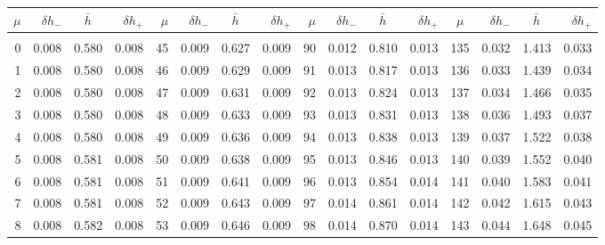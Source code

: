 \clearpage
\begin{table}[!h]\centering
\vspace{0.25cm}
\scriptsize{ \begin{tabular}{rrrr|rrrr|rrrr|crrr}
$\mu$ & $\delta h_-$  & $\bar{h}~~~~$ & $\delta h_+$ &
$\mu$ & $\delta h_-$  & $\bar{h}~~~~$ & $\delta h_+$ &
$\mu$ & $\delta h_-$  & $\bar{h}~~~~$ & $\delta h_+$ &
$\mu$ & $\delta h_-$  & $\bar{h}~~~~$ & $\delta h_+$ \\\hline
&&&&&&&&&&&&&&&\\[-1.75ex]
  0 & \tiny{  0.008} &   0.580 & \tiny{  0.008} &  45 & \tiny{  0.009} &   0.627 & \tiny{  0.009} &  90 & \tiny{  0.012} &   0.810 & \tiny{  0.013} & 135 & \tiny{  0.032} &   1.413 & \tiny{  0.033}\\
  1 & \tiny{  0.008} &   0.580 & \tiny{  0.008} &  46 & \tiny{  0.009} &   0.629 & \tiny{  0.009} &  91 & \tiny{  0.013} &   0.817 & \tiny{  0.013} & 136 & \tiny{  0.033} &   1.439 & \tiny{  0.034}\\
  2 & \tiny{  0.008} &   0.580 & \tiny{  0.008} &  47 & \tiny{  0.009} &   0.631 & \tiny{  0.009} &  92 & \tiny{  0.013} &   0.824 & \tiny{  0.013} & 137 & \tiny{  0.034} &   1.466 & \tiny{  0.035}\\
  3 & \tiny{  0.008} &   0.580 & \tiny{  0.008} &  48 & \tiny{  0.009} &   0.633 & \tiny{  0.009} &  93 & \tiny{  0.013} &   0.831 & \tiny{  0.013} & 138 & \tiny{  0.036} &   1.493 & \tiny{  0.037}\\
  4 & \tiny{  0.008} &   0.580 & \tiny{  0.008} &  49 & \tiny{  0.009} &   0.636 & \tiny{  0.009} &  94 & \tiny{  0.013} &   0.838 & \tiny{  0.013} & 139 & \tiny{  0.037} &   1.522 & \tiny{  0.038}\\
  5 & \tiny{  0.008} &   0.581 & \tiny{  0.008} &  50 & \tiny{  0.009} &   0.638 & \tiny{  0.009} &  95 & \tiny{  0.013} &   0.846 & \tiny{  0.013} & 140 & \tiny{  0.039} &   1.552 & \tiny{  0.040}\\
  6 & \tiny{  0.008} &   0.581 & \tiny{  0.008} &  51 & \tiny{  0.009} &   0.641 & \tiny{  0.009} &  96 & \tiny{  0.013} &   0.854 & \tiny{  0.014} & 141 & \tiny{  0.040} &   1.583 & \tiny{  0.041}\\
  7 & \tiny{  0.008} &   0.581 & \tiny{  0.008} &  52 & \tiny{  0.009} &   0.643 & \tiny{  0.009} &  97 & \tiny{  0.014} &   0.861 & \tiny{  0.014} & 142 & \tiny{  0.042} &   1.615 & \tiny{  0.043}\\
  8 & \tiny{  0.008} &   0.582 & \tiny{  0.008} &  53 & \tiny{  0.009} &   0.646 & \tiny{  0.009} &  98 & \tiny{  0.014} &   0.870 & \tiny{  0.014} & 143 & \tiny{  0.044} &   1.648 & \tiny{  0.045}\\

\end{tabular}}
\end{table}
